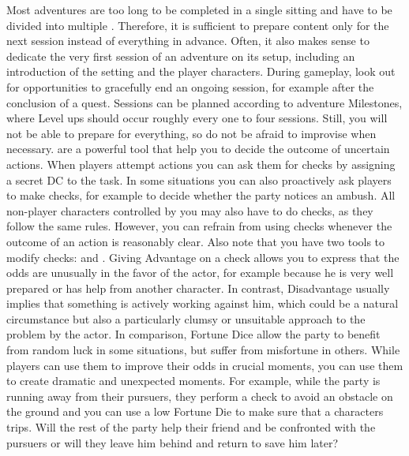 %
\vfill
%
Most adventures are too long to be completed in a single sitting and have to be divided into multiple .
Therefore, it is sufficient to prepare content only for the next session instead of everything in advance.
Often, it also makes sense to dedicate the very first session of an adventure on its setup, including an introduction of the setting and the player characters.
During gameplay, look out for opportunities to gracefully end an ongoing session, for example after the conclusion of a quest.
Sessions can be planned according to adventure Milestones, where Level ups should occur roughly every one to four sessions.
Still, you will not be able to prepare for everything, so do not be afraid to improvise when necessary.
%
\newpage
%
 are a powerful tool that help you to decide the outcome of uncertain actions.
When players attempt actions you can ask them for checks by assigning a secret DC to the task.
In some situations you can also proactively ask players to make checks, for example to decide whether the party notices an ambush.
All non-player characters controlled by you may also have to do checks, as they follow the same rules.
However, you can refrain from using checks whenever the outcome of an action is reasonably clear.
Also note that you have two tools to modify checks:  and . 
Giving Advantage on a check allows you to express that the odds are unusually in the favor of the actor, for example because he is very well prepared or has help from another character. 
In contrast, Disadvantage usually implies that something is actively working against him, which could be a natural circumstance but also a particularly clumsy or unsuitable approach to the problem by the actor.
In comparison, Fortune Dice allow the party to benefit from random luck in some situations, but suffer from misfortune in others.
While players can use them to improve their odds in crucial moments, you can use them to create dramatic and unexpected moments.
For example, while the party is running away from their pursuers, they perform a check to avoid an obstacle on the ground and you can use a low Fortune Die to make sure that a characters trips. 
Will the rest of the party help their friend and be confronted with the pursuers or will they leave him behind and return to save him later?
%
\ofpar
%
